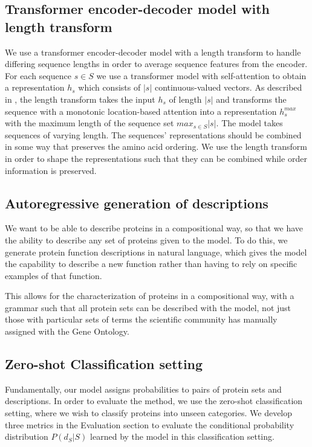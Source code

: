 \documentclass{article}
\begin{document}
    \subsection{Transformer encoder-decoder model with length transform}
    We use a transformer encoder-decoder model \citep{vaswani2017attention} with a length transform to handle differing sequence lengths in order to average sequence features from the encoder. 
    For each sequence $s \in S$ we use a transformer model with self-attention to obtain a representation $h_{s}$ which consists of $|s|$ continuous-valued vectors. 
    As described in \cite{shu2020latent}, the length transform takes the input $h_{s}$ of length $|s|$ and transforms the sequence with a monotonic location-based attention into a representation $h^{max}_{s}$ with the maximum length of the sequence set $max_{s \in S}|s|$. 
    The model takes sequences of varying length. The sequences' representations should be combined in some way that preserves the amino acid ordering. We use the length transform in order to shape the representations such that they can be combined while order information is preserved.
    
    \subsection{Autoregressive generation of descriptions}
    We want to be able to describe proteins in a compositional way, so that we have the ability to describe any set of proteins given to the model. To do this, we generate protein function descriptions in natural language, which gives the model the capability to describe a new function rather than having to rely on specific examples of that function.

     This allows for the characterization of proteins in a compositional way, with a grammar such that all protein sets can be described with the model, not just those with particular sets of terms the scientific community has manually assigned with the Gene Ontology. 

    \subsection{Zero-shot Classification setting}
Fundamentally, our model assigns probabilities to pairs of protein sets and descriptions. In order to evaluate the method, we use the zero-shot classification setting, where we wish to classify proteins into unseen categories. We develop three metrics in the Evaluation section to evaluate the conditional probability distribution $P(d_{S}|S)$ learned by the model in this classification setting.
\end{document}
